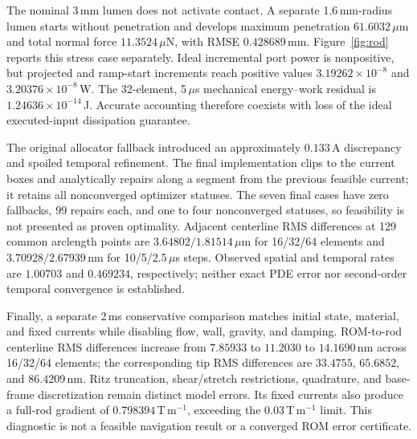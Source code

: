 The nominal 3\,mm lumen does not activate contact. A separate 1.6\,mm-radius lumen starts without penetration and develops maximum penetration $61.6032$\,$\mu$m and total normal force $11.3524$\,$\mu$N, with RMSE $0.428689$\,mm. Figure~\ref{fig:rod} reports this stress case separately. Ideal incremental port power is nonpositive, but projected and ramp-start increments reach positive values $3.19262\times10^{-8}$ and $3.20376\times10^{-8}$\,W. The 32-element, 5\,$\mu$s mechanical energy--work residual is $1.24636\times10^{-14}$\,J. Accurate accounting therefore coexists with loss of the ideal executed-input dissipation guarantee.

The original allocator fallback introduced an approximately $0.133$\,A discrepancy and spoiled temporal refinement. The final implementation clips to the current boxes and analytically repairs along a segment from the previous feasible current; it retains all nonconverged optimizer statuses. The seven final cases have zero fallbacks, 99 repairs each, and one to four nonconverged statuses, so feasibility is not presented as proven optimality. Adjacent centerline RMS differences at 129 common arclength points are $3.64802/1.81514$\,$\mu$m for 16/32/64 elements and $3.70928/2.67939$\,nm for 10/5/2.5\,$\mu$s steps. Observed spatial and temporal rates are $1.00703$ and $0.469234$, respectively; neither exact PDE error nor second-order temporal convergence is established.

Finally, a separate 2\,ms conservative comparison matches initial state, material, and fixed currents while disabling flow, wall, gravity, and damping. ROM-to-rod centerline RMS differences increase from $7.85933$ to $11.2030$ to $14.1690$\,nm across 16/32/64 elements; the corresponding tip RMS differences are $33.4755$, $65.6852$, and $86.4209$\,nm. Ritz truncation, shear/stretch restrictions, quadrature, and base-frame discretization remain distinct model errors. Its fixed currents also produce a full-rod gradient of $0.798394$\,T\,m$^{-1}$, exceeding the $0.03$\,T\,m$^{-1}$ limit. This diagnostic is not a feasible navigation result or a converged ROM error certificate.
